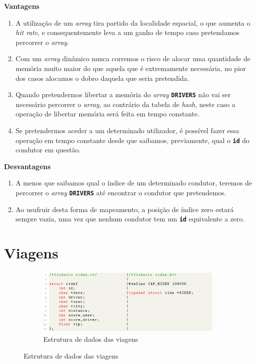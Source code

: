 \documentclass[12pt,a4paper]{report}
\begin{document}
\normalsize\textbf{Vantagens}
    \begin{enumerate}
        \item A utilização de um \textit{array} tira partido da localidade espacial, o que aumenta o \textit{hit rate}, e consequentemente leva a um ganho de tempo caso pretendamos percorrer o \textit{array}.
        
        \item Com um \textit{array} dinâmico nunca corremos o risco de alocar uma quantidade de memória muito maior do que aquela que é extremamente necessária, no pior dos casos alocamos o dobro daquela que seria pretendida.
        
        \item Quando pretendermos libertar a memória do \textit{array} \textbf{\small\texttt{DRIVERS}} não vai ser necessário percorrer o \textit{array}, ao contrário da tabela de \textit{hash}, neste caso a operação de libertar memória será feita em tempo constante.
        
        \item Se pretendermos aceder a um determinado utilizador, é possível fazer essa operação em tempo constante desde que saibamos, previamente, qual o \textbf{\small\texttt{id}} do condutor em questão.
    \end{enumerate}

\normalsize\textbf{Desvantagens}
    \begin{enumerate}
        \item A menos que saibamos qual o índice de um determinado condutor, teremos de percorrer o \textit{array} \textbf{\small\texttt{DRIVERS}} até encontrar o condutor que pretendemos.

        \item Ao usufruir desta forma de mapeamento, a posição de índice zero estará sempre vazia, uma vez que nenhum condutor tem um \textbf{\small\texttt{id}} equivalente a zero.
    \end{enumerate}

\pagebreak
\section{Viagens}

\begin{figure}[hbt!]
    \centering
    \begin{subfigure}{\textwidth}
        \centering
        \includegraphics[width=1\linewidth]{images/rides.png}
        \caption*{Estrutura de dados das viagens}
        \label{fig:rides}
    \end{subfigure}
\end{figure}
\end{document}
